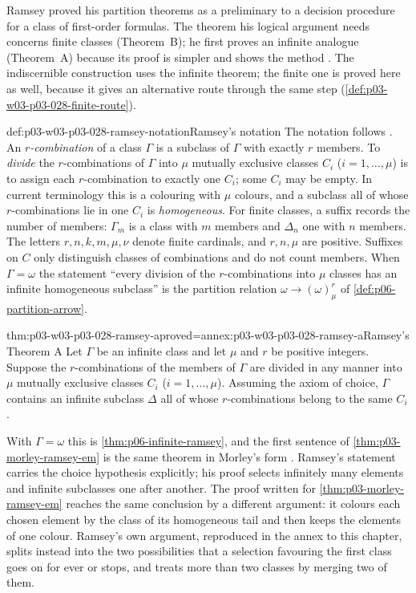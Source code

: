 Ramsey proved his partition theorems as a preliminary to a decision
procedure for a class of first-order formulas.  The theorem his logical
argument needs concerns finite classes (Theorem~B); he first proves an
infinite analogue (Theorem~A) because its proof is simpler and shows the
method \cite[p.~264]{Ramsey1930}.  The indiscernible construction uses the
infinite theorem; the finite one is proved here as well, because it gives
an alternative route through the same step
(\cref{def:p03-w03-p03-028-finite-route}).

\begin{hbconvention}{def:p03-w03-p03-028-ramsey-notation}{Ramsey's notation}
The notation follows \cite[pp.~264, 266--267]{Ramsey1930}.  An
\emph{\(r\)-combination} of a class \(\Gamma\) is a subclass of \(\Gamma\)
with exactly \(r\) members.  To \emph{divide} the \(r\)-combinations of
\(\Gamma\) into \(\mu\) mutually exclusive classes \(C_i\)
(\(i=1,\ldots,\mu\)) is to assign each \(r\)-combination to exactly one
\(C_i\); some \(C_i\) may be empty.  In current terminology this is a
colouring with \(\mu\) colours, and a subclass all of whose
\(r\)-combinations lie in one \(C_i\) is \emph{homogeneous}.  For finite
classes, a suffix records the number of members: \(\Gamma_m\) is a class
with \(m\) members and \(\Delta_n\) one with \(n\) members.  The letters
\(r,n,k,m,\mu,\nu\) denote finite cardinals, and \(r,n,\mu\) are positive.
Suffixes on \(C\) only distinguish classes of combinations and do not count
members.  When \(\Gamma=\omega\) the statement ``every division of the
\(r\)-combinations into \(\mu\) classes has an infinite homogeneous
subclass'' is the partition relation
\(\omega\longrightarrow(\omega)^r_\mu\) of \cref{def:p06-partition-arrow}.
\end{hbconvention}

\begin{hbtheorem}{thm:p03-w03-p03-028-ramsey-a}{proved=annex:p03-w03-p03-028-ramsey-a}{Ramsey's Theorem A}
Let \(\Gamma\) be an infinite class and let \(\mu\) and \(r\) be positive
integers.  Suppose the \(r\)-combinations of the members of \(\Gamma\) are
divided in any manner into \(\mu\) mutually exclusive classes \(C_i\)
(\(i=1,\ldots,\mu\)).  Assuming the axiom of choice, \(\Gamma\) contains an
infinite subclass \(\Delta\) all of whose \(r\)-combinations belong to the
same \(C_i\) \cite[p.~264, proof pp.~264--266]{Ramsey1930}.
\end{hbtheorem}

With \(\Gamma=\omega\) this is \cref{thm:p06-infinite-ramsey}, and the
first sentence of \cref{thm:p03-morley-ramsey-em} is the same theorem in
Morley's form \cite[Theorem~3.1, p.~525]{Morley1965}.  Ramsey's
statement carries the choice hypothesis explicitly; his proof selects
infinitely many elements and infinite subclasses one after another.  The
proof written for \cref{thm:p03-morley-ramsey-em} reaches the same
conclusion by a different argument: it colours each chosen element by the
class of its homogeneous tail and then keeps the elements of one colour.
Ramsey's own argument, reproduced in the annex to this chapter, splits
instead into the two possibilities that a selection favouring the first
class goes on for ever or stops, and treats more than two classes by
merging two of them.

